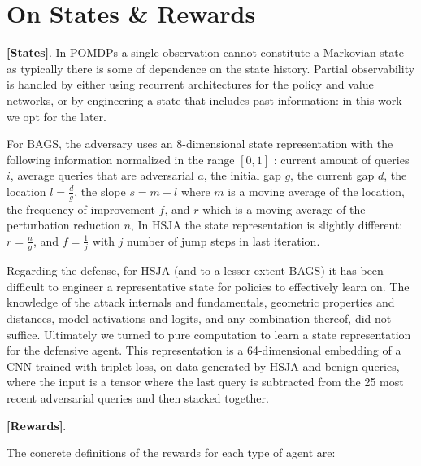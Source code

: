 \section{On States \& Rewards}
\label{apx:rew}
\textbf{[States]}. In POMDPs a single observation cannot constitute a Markovian state as typically there is some of dependence on the state history.
Partial observability is handled by either using recurrent architectures for the policy and value networks, or by engineering a state that includes past information: in this work we opt for the later.

For BAGS, the adversary uses an 8-dimensional state representation with the following information normalized in the range $[0,1]$ : current amount of queries $i$, average queries that are adversarial $a$, the initial gap $g$, the current gap $d$, the location $l = \frac{d}{g}$, the slope $s = m - l$ where $m$ is a moving average of the location, the frequency of improvement $f$, and $r$ which is a moving average of the perturbation reduction $n$, 
In HSJA the state representation is slightly different: $r = \frac{n}{g}$, and $f = \frac{1}{j}$ with $j$ number of jump steps in last iteration.

Regarding the defense, for HSJA (and to a lesser extent BAGS) it has been difficult to engineer a representative state for policies to effectively learn on.
The knowledge of the attack internals and fundamentals, geometric properties and distances, model activations and logits, and any combination thereof, did not suffice.
Ultimately we turned to pure computation to learn a state representation for the defensive agent.
This representation is a 64-dimensional embedding of a CNN trained with triplet loss, on data generated by HSJA and benign queries, where the input is a tensor where the last query is subtracted from the 25 most recent adversarial queries and then stacked together.

\textbf{[Rewards]}.

The concrete definitions of the rewards for each type of agent are:

